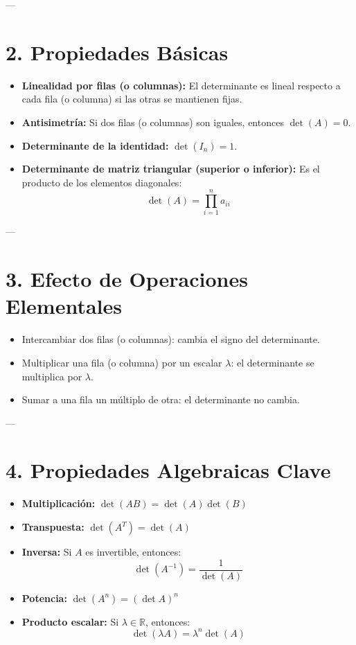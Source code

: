 \documentclass{article}
\begin{document}
---

\section*{2. Propiedades Básicas}

\begin{itemize}
    \item \textbf{Linealidad por filas (o columnas):} El determinante es lineal respecto a cada fila (o columna) si las otras se mantienen fijas.
    \item \textbf{Antisimetría:} Si dos filas (o columnas) son iguales, entonces \(\det(A) = 0\).
    \item \textbf{Determinante de la identidad:} \(\det(I_n) = 1\).
    \item \textbf{Determinante de matriz triangular (superior o inferior):} Es el producto de los elementos diagonales:
    \[
    \det(A) = \prod_{i=1}^n a_{ii}
    \]
\end{itemize}

---

\section*{3. Efecto de Operaciones Elementales}

\begin{itemize}
    \item Intercambiar dos filas (o columnas): cambia el signo del determinante.
    \item Multiplicar una fila (o columna) por un escalar \(\lambda\): el determinante se multiplica por \(\lambda\).
    \item Sumar a una fila un múltiplo de otra: el determinante no cambia.
\end{itemize}

---

\section*{4. Propiedades Algebraicas Clave}

\begin{itemize}
    \item \textbf{Multiplicación:} \(\det(AB) = \det(A)\det(B)\)
    \item \textbf{Transpuesta:} \(\det(A^T) = \det(A)\)
    \item \textbf{Inversa:} Si \(A\) es invertible, entonces:
    \[
    \det(A^{-1}) = \frac{1}{\det(A)}
    \]
    \item \textbf{Potencia:} \(\det(A^n) = (\det A)^n\)
    \item \textbf{Producto escalar:} Si \( \lambda \in \mathbb{R} \), entonces:
    \[
    \det(\lambda A) = \lambda^n \det(A)
    \]
\end{itemize}
\end{document}
